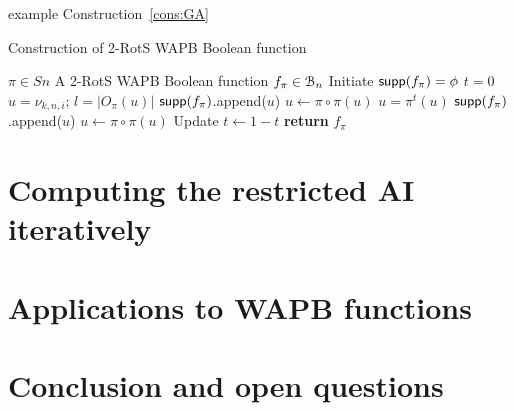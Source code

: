 \documentclass[11pt]{llncs}
\begin{document}
example Construction~\ref{cons:GA}

\begin{constr}
	\caption{Construction of 2-RotS WAPB Boolean function\label{cons:GA}}
	\begin{algorithmic}
		\Require $\pi \in Sn$ %
		\Ensure A 2-RotS WAPB Boolean function $f_\pi \in \mathcal{B}_n$
		\State Initiate $\mathsf{supp}(f_\pi) = \phi$
		\State $t = 0$
		\State $u = \nu_{k,n,i}$; $l= |O_\pi(u)|$
		\State $\mathsf{supp}(f_\pi)$.append($u$)
		\State $ u \gets \pi \circ \pi(u)$
		\EndFor
		\Else
		\State $u = \pi^{t}(u)$
		\State $\mathsf{supp}(f_\pi)$.append($u$)
		\State $ u \gets \pi \circ \pi(u)$ 
		\EndFor 
		\State Update $t \gets 1 - t$
		\EndIf
		\EndFor
		\EndFor
		\State \textbf{return} $f_\pi$
	\end{algorithmic}
	
\end{constr}

\section{Computing the restricted AI iteratively}\label{sec:IterativeApproach}


\section{Applications to WAPB functions}

\section{Conclusion and open questions}




\newpage



\ifnum{}


\else


\fi

\end{document}
